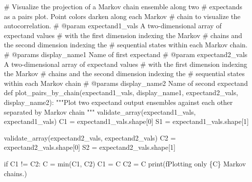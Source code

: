 \documentclass[
  letterpaper,
  DIV=11,
  numbers=noendperiod]{scrartcl}
\newenvironment{Shaded}{\begin{snugshade}}{\end{snugshade}}
\newcommand{\BuiltInTok}[1]{\textcolor[rgb]{0.00,0.23,0.31}{#1}}
\newcommand{\CommentTok}[1]{\textcolor[rgb]{0.37,0.37,0.37}{#1}}
\newcommand{\ControlFlowTok}[1]{\textcolor[rgb]{0.00,0.23,0.31}{#1}}
\newcommand{\DecValTok}[1]{\textcolor[rgb]{0.68,0.00,0.00}{#1}}
\newcommand{\KeywordTok}[1]{\textcolor[rgb]{0.00,0.23,0.31}{#1}}
\newcommand{\NormalTok}[1]{\textcolor[rgb]{0.00,0.23,0.31}{#1}}
\newcommand{\OperatorTok}[1]{\textcolor[rgb]{0.37,0.37,0.37}{#1}}
\newcommand{\SpecialCharTok}[1]{\textcolor[rgb]{0.37,0.37,0.37}{#1}}
\newcommand{\SpecialStringTok}[1]{\textcolor[rgb]{0.13,0.47,0.30}{#1}}
\newcommand{\StringTok}[1]{\textcolor[rgb]{0.13,0.47,0.30}{#1}}
\begin{document}
\begin{Shaded}
\begin{Highlighting}[]
\CommentTok{\# Visualize the projection of a Markov chain ensemble along two}
\CommentTok{\# expectands as a pairs plot.  Point colors darken along each Markov}
\CommentTok{\# chain to visualize the autocorrelation.}
\CommentTok{\# @param expectand1\_vals A two{-}dimensional array of expectand values}
\CommentTok{\#                        with the first dimension indexing the Markov}
\CommentTok{\#                        chains and the second dimension indexing the}
\CommentTok{\#                        sequential states within each Markov chain.}
\CommentTok{\# @params display\_name1 Name of first expectand}
\CommentTok{\# @param expectand2\_vals A two{-}dimensional array of expectand values}
\CommentTok{\#                        with the first dimension indexing the Markov}
\CommentTok{\#                        chains and the second dimension indexing the}
\CommentTok{\#                        sequential states within each Markov chain}
\CommentTok{\# @params display\_name2 Name of second expectand}
\KeywordTok{def}\NormalTok{ plot\_pairs\_by\_chain(expectand1\_vals, display\_name1,}
\NormalTok{                        expectand2\_vals, display\_name2):}
  \CommentTok{"""Plot two expectand output ensembles against each other separated by}
\CommentTok{     Markov chain """}
\NormalTok{  validate\_array(expectand1\_vals, }\StringTok{\textquotesingle{}expectand1\_vals\textquotesingle{}}\NormalTok{)}
\NormalTok{  C1 }\OperatorTok{=}\NormalTok{ expectand1\_vals.shape[}\DecValTok{0}\NormalTok{]}
\NormalTok{  S1 }\OperatorTok{=}\NormalTok{ expectand1\_vals.shape[}\DecValTok{1}\NormalTok{]}

\NormalTok{  validate\_array(expectand2\_vals, }\StringTok{\textquotesingle{}expectand2\_vals\textquotesingle{}}\NormalTok{)}
\NormalTok{  C2 }\OperatorTok{=}\NormalTok{ expectand2\_vals.shape[}\DecValTok{0}\NormalTok{]}
\NormalTok{  S2 }\OperatorTok{=}\NormalTok{ expectand2\_vals.shape[}\DecValTok{1}\NormalTok{]}

  \ControlFlowTok{if}\NormalTok{ C1 }\OperatorTok{!=}\NormalTok{ C2:}
\NormalTok{    C }\OperatorTok{=} \BuiltInTok{min}\NormalTok{(C1, C2)}
\NormalTok{    C1 }\OperatorTok{=}\NormalTok{ C}
\NormalTok{    C2 }\OperatorTok{=}\NormalTok{ C}
    \BuiltInTok{print}\NormalTok{(}\SpecialStringTok{f\textquotesingle{}Plotting only }\SpecialCharTok{\{}\NormalTok{C}\SpecialCharTok{\}}\SpecialStringTok{ Markov chains.\textquotesingle{}}\NormalTok{)}


\end{Highlighting}
\end{Shaded}
\end{document}
